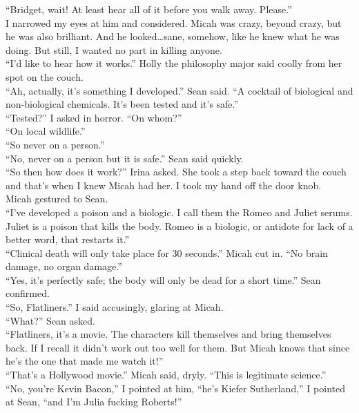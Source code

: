 \documentclass[a5paper]{scrartcl}
\begin{document}
\enquote{Bridget, wait! At least hear all of it before you walk away. Please.}\\
I narrowed my eyes at him and considered. Micah was crazy, beyond crazy, but he was also brilliant. And he looked\dots sane, somehow, like he knew what he was doing. But still, I wanted no part in killing anyone.\\
\enquote{I'd like to hear how it works.} Holly the philosophy major said coolly from her spot on the couch.\\
\enquote{Ah, actually, it's something I developed.} Sean said. \enquote{A cocktail of biological and non-biological chemicals. It's been tested and it's safe.}\\
\enquote{Tested?} I asked in horror. \enquote{On whom?}\\
\enquote{On local wildlife.}\\
\enquote{So never on a person.}\\
\enquote{No, never on a person but it is safe.} Sean said quickly.\\
\enquote{So then how does it work?} Irina asked. She took a step back toward the couch and that’s when I knew Micah had her. I took my hand off the door knob.\\
Micah gestured to Sean.\\
\enquote{I've developed a poison and a biologic. I call them the Romeo and Juliet serums. Juliet is a poison that kills the body. Romeo is a biologic, or antidote for lack of a better word, that restarts it.}\\
\enquote{Clinical death will only take place for 30 seconds.” Micah cut in. “No brain damage, no organ damage.}\\
“Yes, it’s perfectly safe; the body will only be dead for a short time.” Sean confirmed.\\
\enquote{So, Flatliners.} I said accusingly, glaring at Micah.\\
\enquote{What?} Sean asked.\\
\enquote{Flatliners, it's a movie. The characters kill themselves and bring themselves back. If I recall it didn't work out too well for them. But Micah knows that since he’s the one that made me watch it!}\\
\enquote{That's a Hollywood movie.} Micah said, dryly. \enquote{This is legitimate science.}\\
\enquote{No, you're Kevin Bacon,” I pointed at him, “he's Kiefer Sutherland,} I pointed at Sean, \enquote{and I'm Julia fucking Roberts!}\\
\end{document}
